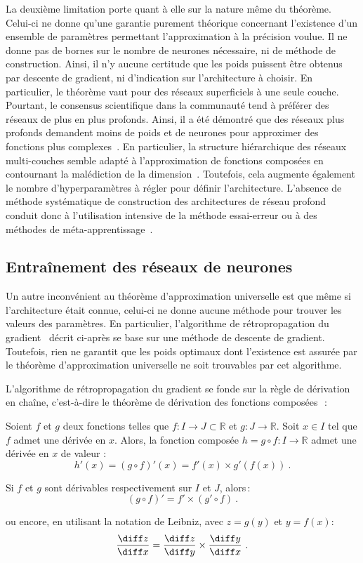 La deuxième limitation porte quant à elle sur la nature même du théorème. Celui-ci ne donne qu'une garantie purement théorique concernant l'existence d'un ensemble de paramètres permettant l'approximation à la précision voulue. Il ne donne pas de bornes sur le nombre de neurones nécessaire, ni de méthode de construction. Ainsi, il n'y aucune certitude que les poids puissent être obtenus par descente de gradient, ni d'indication sur l'architecture à choisir. En particulier, le théorème vaut pour des réseaux superficiels à une seule couche. Pourtant, le consensus scientifique dans la communauté tend à préférer des réseaux de plus en plus profonds. Ainsi, il a été démontré que des réseaux plus profonds demandent moins de poids et de neurones pour approximer des fonctions plus complexes~\cite{bianchini_complexity_2014,mhaskar_when_2017}. En particulier, la structure hiérarchique des réseaux multi-couches semble adapté à l'approximation de fonctions composées en contournant la malédiction de la dimension~\cite{poggio_why_2017}. Toutefois, cela augmente également le nombre d'hyperparamètres à régler pour définir l'architecture. L'absence de méthode systématique de construction des architectures de réseau profond conduit donc à l'utilisation intensive de la méthode essai-erreur ou à des méthodes de méta-apprentissage~\cite{zoph_neural_2016}.

\subsection{Entraînement des réseaux de neurones}

Un autre inconvénient au théorème d'approximation universelle est que même si l'architecture était connue, celui-ci ne donne aucune méthode pour trouver les valeurs des paramètres. En particulier, l'algorithme de rétropropagation du gradient~\cite{werbos_beyond_1975,rumelhart_learning_1986,lecun_learning_1986} décrit ci-après se base sur une méthode de descente de gradient. Toutefois, rien ne garantit que les poids optimaux dont l'existence est assurée par le théorème d'approximation universelle ne soit trouvables par cet algorithme.

L'algorithme de rétropropagation du gradient se fonde sur la règle de dérivation en chaîne, c'est-à-dire le théorème de dérivation des fonctions composées~\cite{lhospital_analyse_1716,lagrange_theorie_1797}\,:
\begin{theorem}
Soient $f$ et $g$ deux fonctions telles que $f : I \rightarrow J \subset \mathbb{R}$ et $g : J \rightarrow \mathbb{R}$. Soit $x \in I$ tel que $f$ admet une dérivée en $x$. Alors, la fonction composée $h = g \circ f : I \rightarrow \mathbb{R}$ admet une dérivée en $x$ de valeur :
$$h'(x) = (g \circ f)'(x) = f'(x) \times g'(f(x))~.$$

Si $f$ et $g$ sont dérivables respectivement sur $I$ et $J$, alors\,:
$$(g \circ f)' = f' \times (g' \circ f)~.$$

ou encore, en utilisant la notation de Leibniz, avec $z = g(y)$ et $y = f(x)$:
$$\frac{\diff z}{\diff x} = \frac{\diff z}{\diff y} \times \frac{\diff y}{\diff x}~.$$
\end{theorem}

